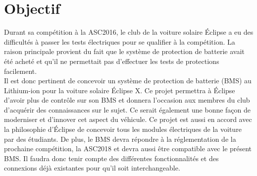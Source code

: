 \section{Objectif}
Durant sa compétition à la ASC2016, le club de la voiture solaire Éclipse a eu des difficultés à passer les tests électriques pour se qualifier à la compétition. La raison principale provient du fait que le système de protection de batterie avait été acheté et qu’il ne permettait pas d’effectuer les tests de protections facilement.\\

Il est donc pertinent de concevoir un système de protection de batterie (BMS) au Lithium-ion pour la voiture solaire Éclipse X. Ce projet permettra à Éclipse d’avoir plus de contrôle sur son BMS et donnera l’occasion aux membres du club d’acquérir des connaissances sur le sujet. Ce serait également une bonne façon de moderniser et d'innover cet aspect du véhicule. Ce projet est aussi en accord avec la philosophie d’Éclipse de concevoir tous les modules électriques de la voiture par des étudiants. De plus, le BMS devra répondre à la réglementation de la prochaine compétition, la ASC2018 et devra aussi être compatible avec le présent BMS. Il faudra donc tenir compte des différentes fonctionnalités et des connexions déjà existantes pour qu’il soit interchangeable.
